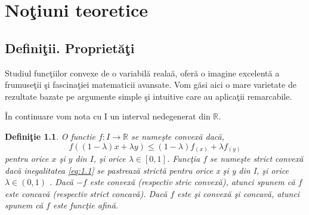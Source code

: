 \documentclass[a4paper,12pt,oneside]{report}
\newtheorem{definition}{Defini\c tie}
\begin{document}
\maketitle

\tableofcontents

%
%
%
%
\chapter{No\c{t}iuni teoretice}

\section{Defini\c{t}ii. Propriet\u{a}\c{t}i}

Studiul func\c{t}iilor convexe de o variabil\u {a} reala\u {a}, ofer\u{a} o imagine excelent\u {a} a frumuse\c {t}ii \c{s}i fascina\c{t}iei matematicii avansate. Vom g\u{a}si aici o mare varietate de rezultate bazate pe argumente simple \c{s}i intuitive care au aplica\c{t}ii remarcabile.

\^{I}n continuare vom nota cu I un interval nedegenerat din \(\mathbb{R}\).

\begin{definition}

O functie \(f: I \rightarrow \mathbb{R}\) se nume\c{s}te convex\u{a} dac\u{a},
\begin{displaymath}
f \left ( \left ( 1 - \lambda  \right )x + \lambda y \right )\leq \left ( 1 - \lambda  \right ) f_{\left ( x \right )} + \lambda f_{\left ( y \right )} 	\label{eq:1.1} \tag{1.1}
\end{displaymath}
pentru orice \(x\) \c{s}i \(y\) din \(I\), \c{s}i orice \(\lambda \in \left [ 0,1 \right ]\). Func\c{t}ia \(f\) se nume\c{s}te strict convex\u{a} dac\u{a} inegalitatea \ref{eq:1.1} se pastreaz\u{a}  strict\u{a} pentru orice x \c{s}i y din I, \c{s}i orice  \(\lambda \in \left ( 0,1 \right )\) . Dac\u{a} \(-f\) este convex\u{a} (respectiv stric convex\u{a}), atunci spunem c\u{a} \(f\) este concav\u{a} (respectiv strict concav\u{a}). Dac\u{a} \(f\) este \c{s}i convex\u{a} \c{s}i concav\u{a}, atunci spunem c\u{a} \(f\) este func\c{t}ie afin\u{a}.
\end{definition}
\end{document}
